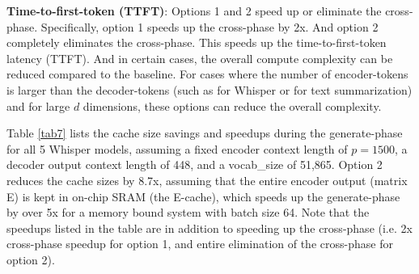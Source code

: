 \documentclass{article}
\begin{document}
\textbf{Time-to-first-token (TTFT)}: Options 1 and 2 speed up or eliminate the cross-phase. Specifically, option 1 speeds up the cross-phase by 2x. And option 2 completely eliminates the cross-phase. This speeds up the time-to-first-token latency (TTFT). And in certain cases, the overall compute complexity can be reduced compared to the baseline. For cases where the number of encoder-tokens is larger than the decoder-tokens (such as for Whisper or for text summarization) and for large $d$ dimensions, these options can reduce the overall complexity.

Table \ref{tab7} lists the cache size savings and speedups during the generate-phase for all 5 Whisper models, assuming a fixed encoder context length of $p = 1500$, a decoder output context length of 448, and a vocab\_size of 51,865. Option 2 reduces the cache sizes by 8.7x, assuming that the entire encoder output (matrix E) is kept in on-chip SRAM (the E-cache), which speeds up the generate-phase by over 5x for a memory bound system with batch size 64. Note that the speedups listed in the table are in addition to speeding up the cross-phase (i.e. 2x cross-phase speedup for option 1, and entire elimination of the cross-phase for option 2).
\end{document}
